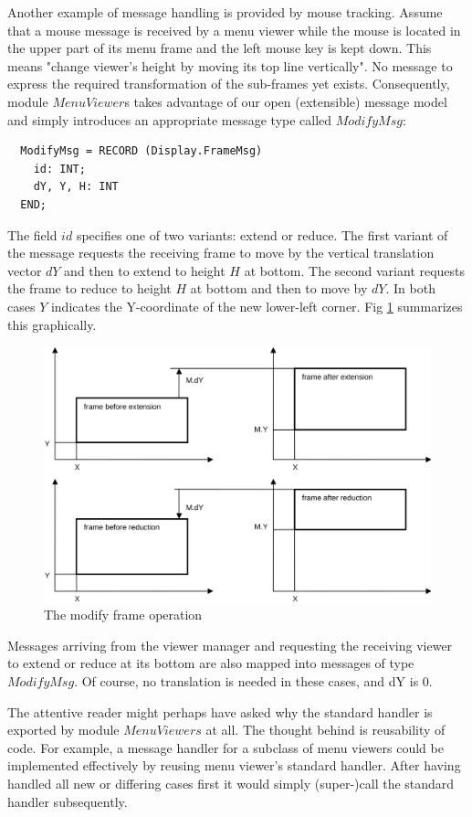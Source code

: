 Another example of message handling is provided by mouse tracking. Assume that a mouse
message is received by a menu viewer while the mouse is located in the upper part of its menu
frame and the left mouse key is kept down. This means "change viewer's height by moving its top
line vertically". No message to express the required transformation of the sub-frames yet exists.
Consequently, module $MenuViewer$s takes advantage of our open (extensible) message model
and simply introduces an appropriate message type called $ModifyMsg$:
\begin{verbatim}
  ModifyMsg = RECORD (Display.FrameMsg)
    id: INT;
    dY, Y, H: INT
  END;
\end{verbatim}
The field $id$ specifies one of two variants: extend or reduce. The first variant of the message
requests the receiving frame to move by the vertical translation vector $dY$ and then to extend to
height $H$ at bottom. The second variant requests the frame to reduce to height $H$ at bottom and
then to move by $dY$. In both cases $Y$ indicates the Y-coordinate of the new lower-left corner.
Fig \ref{fig:modify} summarizes this graphically.
\begin{figure}
	\centering
	\includegraphics[width=\textwidth]{i/a}
	\caption{The modify frame operation}
	\label{fig:modify}
\end{figure}

Messages arriving from the viewer manager and requesting the receiving viewer to extend or
reduce at its bottom are also mapped into messages of type $ModifyMsg$. Of course, no translation
is needed in these cases, and dY is 0.

The attentive reader might perhaps have asked why the standard handler is exported by module
$MenuViewers$ at all. The thought behind is reusability of code. For example, a message handler
for a subclass of menu viewers could be implemented effectively by reusing menu viewer's
standard handler. After having handled all new or differing cases first it would simply (super-)call
the standard handler subsequently.

